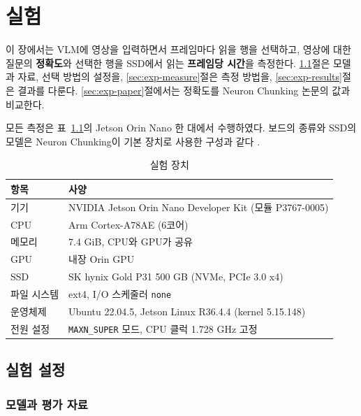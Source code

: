 \chapter{실험}\label{chap:experiments}

이 장에서는 VLM에 영상을 입력하면서 프레임마다 읽을 행을 선택하고, 영상에 대한 질문의 \textbf{정확도}와 선택한 행을 SSD에서 읽는 \textbf{프레임당 시간}을 측정한다. \ref{sec:exp-setup}절은 모델과 자료, 선택 방법의 설정을, \ref{sec:exp-measure}절은 측정 방법을, \ref{sec:exp-results}절은 결과를 다룬다. \ref{sec:exp-paper}절에서는 정확도를 Neuron Chunking 논문의 값과 비교한다.

모든 측정은 표~\ref{tab:environment}의 Jetson Orin Nano 한 대에서 수행하였다. 보드의 종류와 SSD의 모델은 Neuron Chunking이 기본 장치로 사용한 구성과 같다 \cite{yang2025}.

\begin{table}[htbp]
    \centering
    \caption{실험 장치}
    \label{tab:environment}
    \begin{tabular}{ll}
        \toprule
        항목 & 사양 \\
        \midrule
        기기 & NVIDIA Jetson Orin Nano Developer Kit (모듈 P3767-0005) \\
        CPU & Arm Cortex-A78AE (6코어) \\
        메모리 & 7.4 GiB, CPU와 GPU가 공유 \\
        GPU & 내장 Orin GPU \\
        SSD & SK hynix Gold P31 500 GB (NVMe, PCIe 3.0 x4) \\
        파일 시스템 & ext4, I/O 스케줄러 \texttt{none} \\
        운영체제 & Ubuntu 22.04.5, Jetson Linux R36.4.4 (kernel 5.15.148) \\
        전원 설정 & \texttt{MAXN\_SUPER} 모드, CPU 클럭 1.728 GHz 고정 \\
        \bottomrule
    \end{tabular}
\end{table}

\section{실험 설정}\label{sec:exp-setup}

\subsection{모델과 평가 자료}\label{sec:exp-model}

